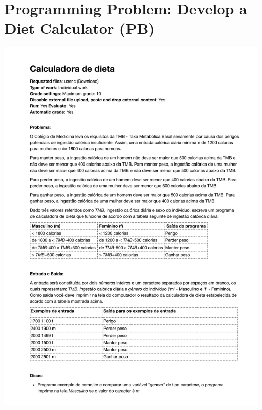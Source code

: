 \section{Programming Problem: Develop a Diet Calculator (PB)}
\label{annex:first-study-pB}
\includegraphics[page=1,width=1\textwidth]{images/annex/first-study-pB.pdf}

\newpage
